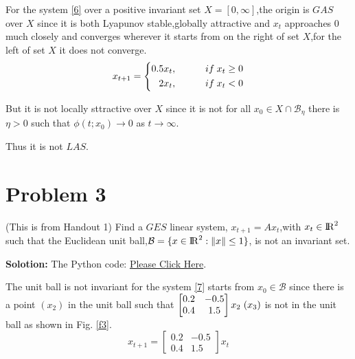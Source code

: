 \documentclass[a4paper,11pt,reqno]{amsart}
\newcommand{\R}{{\rm I\!R}}
\begin{document}
For the system \eqref{6} over a positive invariant set $X = [0,\infty]$,the origin is $GAS$ over $X$ since 
it is both Lyapunov stable,globally attractive and $x_t$ approaches 0 much closely
and converges wherever it starts from on the right of set $X$,for the left of set $X$ it does not converge.
\begin{equation}
    x_{t+1}=\left\{
    \begin{aligned}
    0.5x_t, \hspace{3em} if \hspace{0.25em} x_t \geq 0 \\
    2x_t, \hspace{3em} if \hspace{0.25em} x_t < 0
    \label{6}
    \end{aligned}
    \right.
\end{equation}

But it is not locally sttractive over $X$ since it is not for all $x_0 \in X \cap \mathcal{B_\eta}$
there is $\eta > 0$ such that $\phi(t;x_0) \rightarrow 0$ as $t \rightarrow \infty$.

Thus it is not $LAS$.


\section{Problem 3}
(This is from Handout 1) Find a $GES$ linear system, $x_{t+1} = Ax_t$,with $x_t\in\R^2$ such that the Euclidean
unit ball,$\mathcal{B} = \{x\in\R^2:\Vert x \Vert \leq 1\}$, is not an invariant set.

\textbf{Solotion:}
The Python code: \href{https://github.com/Chanawesome/ELE8088-EXTRA/blob/main/Problem3.py}{Please Click Here}.

The unit ball is not invariant for the system \eqref{7} starts from $x_0 \in \mathcal{B}$ since
there is a point $(x_2)$ in the unit ball such that $\begin{bmatrix}0.2 & -0.5 \\ 0.4 & 1.5 \end{bmatrix} x_2 \hspace{0.3em} (x_3)$ 
is not in the unit ball as shown in Fig. \ref{f3}.
\begin{equation}
    x_{t+1} = \begin{bmatrix} 0.2 & -0.5 \\ 0.4 & 1.5 \end{bmatrix} x_t
    \label{7}
\end{equation}
\end{document}
